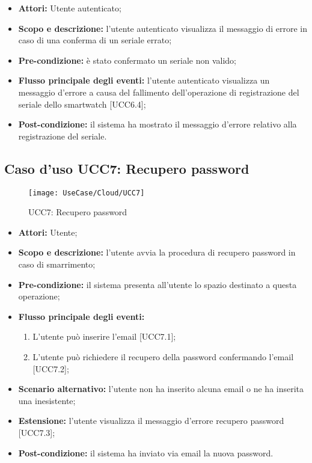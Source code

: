 \begin{itemize}
\item \textbf{Attori:} Utente autenticato;
\item \textbf{Scopo e descrizione:} l'utente autenticato visualizza il messaggio di errore in caso di una conferma di un seriale errato;
\item \textbf{Pre-condizione:} è stato confermato un seriale non valido;
\item \textbf{Flusso principale degli eventi:} l'utente autenticato visualizza un messaggio d'errore a causa del fallimento dell'operazione di registrazione del seriale dello smartwatch [UCC6.4];
\item \textbf{Post-condizione:} il sistema ha mostrato il messaggio d'errore relativo alla registrazione del seriale.
\end{itemize}


\subsection{Caso d'uso UCC7: Recupero password}

\begin{figure}[H]
\centering
\texttt{[image: UseCase/Cloud/UCC7]}
\caption{UCC7: Recupero password}
\end{figure}

\begin{itemize}
\item \textbf{Attori:} Utente;
\item \textbf{Scopo e descrizione:} l'utente avvia la procedura di recupero password in caso di smarrimento;
\item \textbf{Pre-condizione:} il sistema presenta all'utente lo spazio destinato a questa operazione;
\item \textbf{Flusso principale degli eventi:}
\begin{enumerate}
\item L'utente può inserire l'email [UCC7.1];
\item L'utente può richiedere il recupero della password confermando l'email [UCC7.2];
\end{enumerate}
\item \textbf{Scenario alternativo:} l'utente non ha inserito alcuna email o ne ha inserita una inesistente;
\item \textbf{Estensione:} l'utente visualizza il messaggio d'errore recupero password [UCC7.3];
\item \textbf{Post-condizione:} il sistema ha inviato via email la nuova password.  
\end{itemize}

